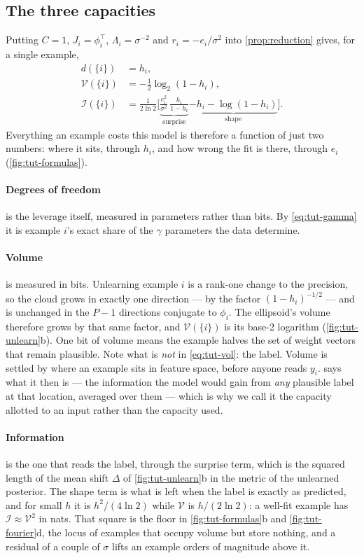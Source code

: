 \documentclass[10pt,twocolumn,letterpaper]{article}
\theoremstyle{definition}
\newcommand{\Vol}{\mathcal{V}}
\newcommand{\Inf}{\mathcal{I}}
\newcommand{\T}{^{\top}}
\newcommand{\dof}{d}
\begin{document}
\subsection{The three capacities}
Putting $C=1$, $J_i=\phi_i\T$, $\Lambda_i=\sigma^{-2}$ and $r_i=-e_i/\sigma^2$ into \cref{prop:reduction} gives, for a single example,
\begin{align}
\dof(\{i\})&=h_i,\label{eq:tut-dof}\\
\Vol(\{i\})&=-\tfrac12\log_2(1-h_i),\label{eq:tut-vol}\\
\Inf(\{i\})&=\frac{1}{2\ln2}\Big[\underbrace{\frac{e_i^2}{\sigma^2}\,\frac{h_i}{1-h_i}}_{\text{surprise}}\underbrace{-h_i-\log(1-h_i)}_{\text{shape}}\Big].\label{eq:tut-inf}
\end{align}
Everything an example costs this model is therefore a function of just two numbers: where it sits, through $h_i$, and how wrong the fit is there, through $e_i$ (\cref{fig:tut-formulas}).

\paragraph{Degrees of freedom} is the leverage itself, measured in parameters rather than bits. By \cref{eq:tut-gamma} it is example $i$'s exact share of the $\gamma$ parameters the data determine.

\paragraph{Volume} is measured in bits. Unlearning example $i$ is a rank-one change to the precision, so the cloud grows in exactly one direction --- by the factor $(1-h_i)^{-1/2}$ --- and is unchanged in the $P-1$ directions conjugate to $\phi_i$. The ellipsoid's volume therefore grows by that same factor, and $\Vol(\{i\})$ is its base-2 logarithm (\cref{fig:tut-unlearn}b). One bit of volume means the example halves the set of weight vectors that remain plausible. Note what is \emph{not} in \cref{eq:tut-vol}: the label. Volume is settled by where an example sits in feature space, before anyone reads $y_i$.  says what it then is --- the information the model would gain from \emph{any} plausible label at that location, averaged over them --- which is why we call it the capacity allotted to an input rather than the capacity used.

\paragraph{Information} is the one that reads the label, through the surprise term, which is the squared length of the mean shift $\Delta$ of \cref{fig:tut-unlearn}b in the metric of the unlearned posterior. The shape term is what is left when the label is exactly as predicted, and for small $h$ it is $h^2/(4\ln2)$ while $\Vol$ is $h/(2\ln2)$: a well-fit example has $\Inf\approx\Vol^2$ in nats. That square is the floor in \cref{fig:tut-formulas}b and \cref{fig:tut-fourier}d, the locus of examples that occupy volume but store nothing, and a residual of a couple of $\sigma$ lifts an example orders of magnitude above it.
\end{document}
